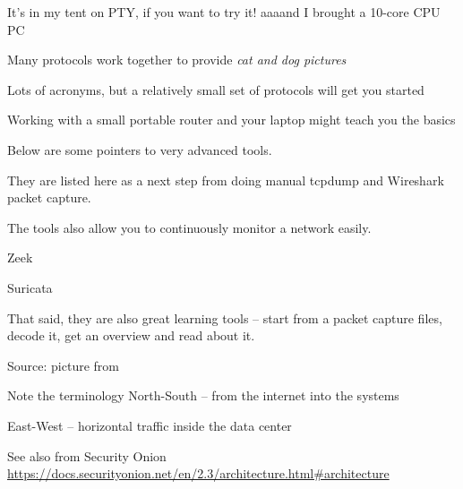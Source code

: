 \documentclass[Screen16to9,17pt]{foils}
\begin{document}
It's in my tent on PTY, if you want to try it! aaaand I brought a 10-core CPU PC




\begin{list2}
\item Many protocols work together to provide \emph{cat and dog pictures}
\item Lots of acronyms, but a relatively small set of protocols will get you started
\item Working with a small portable router and your laptop might teach you the basics
\end{list2}

\myquestionspage




Below are some pointers to very advanced tools.

They are listed here as a next step from doing manual tcpdump and Wireshark packet capture.

The tools also allow you to continuously monitor a network easily.

\begin{list2}
\item Zeek
\item Suricata
\end{list2}

That said, they are also great learning tools -- start from a packet capture files, decode it, get an overview and read about it.


Source: picture from 

\begin{list2}
\item Note the terminology North-South -- from the internet into the systems
\item East-West -- horizontal traffic inside the data center
\item See also from Security Onion \url{https://docs.securityonion.net/en/2.3/architecture.html#architecture}
\end{list2}



\end{document}
